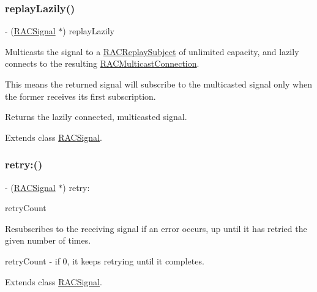 \subsubsection{\texorpdfstring{replay\+Lazily()}{replayLazily()}\hspace{0.1cm}{\footnotesize\ttfamily [3/3]}}
{\footnotesize\ttfamily -\/ (\mbox{\hyperlink{interface_r_a_c_signal}{R\+A\+C\+Signal}} $\ast$) replay\+Lazily \begin{DoxyParamCaption}{ }\end{DoxyParamCaption}}

Multicasts the signal to a \mbox{\hyperlink{interface_r_a_c_replay_subject}{R\+A\+C\+Replay\+Subject}} of unlimited capacity, and lazily connects to the resulting \mbox{\hyperlink{interface_r_a_c_multicast_connection}{R\+A\+C\+Multicast\+Connection}}.

This means the returned signal will subscribe to the multicasted signal only when the former receives its first subscription.

Returns the lazily connected, multicasted signal. 

Extends class \mbox{\hyperlink{interface_r_a_c_signal_aa1a3386d321ec82ceff16d98eaf74d33}{R\+A\+C\+Signal}}.

\mbox{\label{category_r_a_c_signal_07_operations_08_a3601540c46ceb34dbd1c242782022809}} 
\subsubsection{\texorpdfstring{retry\+:()}{retry:()}\hspace{0.1cm}{\footnotesize\ttfamily [1/3]}}
{\footnotesize\ttfamily -\/ (\mbox{\hyperlink{interface_r_a_c_signal}{R\+A\+C\+Signal}} $\ast$) retry\+: \begin{DoxyParamCaption}\item[{(N\+S\+Integer)}]{retry\+Count }\end{DoxyParamCaption}}

Resubscribes to the receiving signal if an error occurs, up until it has retried the given number of times.

retry\+Count -\/ if 0, it keeps retrying until it completes. 

Extends class \mbox{\hyperlink{interface_r_a_c_signal_a3601540c46ceb34dbd1c242782022809}{R\+A\+C\+Signal}}.

